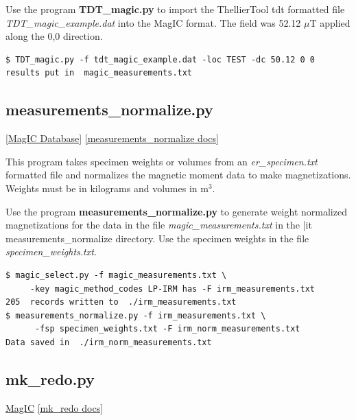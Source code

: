 \documentclass[11pt]{book}
\begin{document}
{{Use the program {\bf TDT\_magic.py} to import the ThellierTool tdt formatted file  {\it TDT\_magic\_example.dat} into the MagIC format.   The field was 52.12 $\mu$T applied along the 0,0 direction.

\begin{verbatim}
$ TDT_magic.py -f tdt_magic_example.dat -loc TEST -dc 50.12 0 0
results put in  magic_measurements.txt
\end{verbatim}


\subsection{measurements\_normalize.py}
\href{#MagICDatabase}{[MagIC Database]}
\href{https://github.com/PmagPy/PmagPy/blob/master/programs/measurements_normalize.py}{[measurements\_normalize docs]}

This program takes specimen weights or volumes from an {\it er\_specimen.txt} formatted file and normalizes the magnetic moment data to make  magnetizations.  Weights must be in kilograms and volumes in m$^3$.

Use the program {\bf measurements\_normalize.py} to generate weight normalized magnetizations for the data in the file {\it magic\_measurements.txt} in the {|it measurements\_normalize} directory.  Use the specimen weights in the file {\it specimen\_weights.txt}.

\begin{verbatim}
$ magic_select.py -f magic_measurements.txt \
     -key magic_method_codes LP-IRM has -F irm_measurements.txt
205  records written to  ./irm_measurements.txt
$ measurements_normalize.py -f irm_measurements.txt \
      -fsp specimen_weights.txt -F irm_norm_measurements.txt
Data saved in  ./irm_norm_measurements.txt
\end{verbatim}


\subsection{mk\_redo.py}
\href{#MagIC}{MagIC}
\href{https://github.com/PmagPy/PmagPy/blob/master/programs/mk_redo.py}{[mk\_redo docs]}

}}
\end{document}

